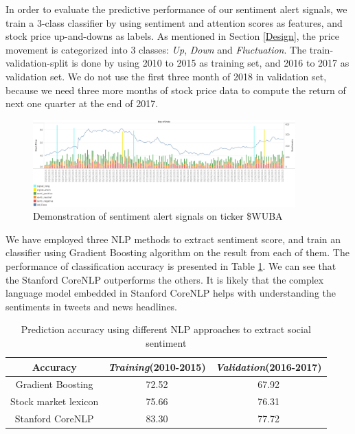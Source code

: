 \documentclass[conference]{IEEEtran}
\begin{document}
In order to evaluate the predictive performance of our sentiment alert signals, we train a 3-class classifier by using sentiment and attention scores as features, and stock price up-and-downs as labels. As mentioned in Section \ref{Design}, the price movement is categorized into 3 classes: \textit{Up}, \textit{Down} and \textit{Fluctuation}. The train-validation-split is done by using 2010 to 2015 as training set, and 2016 to 2017 as validation set. We do not use the first three month of 2018 in validation set, because we need three more months of stock price data to compute the return of next one quarter at the end of 2017. 

\begin{figure}[ht]
\centering
\includegraphics[width=0.9\textwidth]{pics/wubaNew2.png}
\caption{Demonstration of sentiment alert signals on ticker \$WUBA }
\label{wuba}
\end{figure}

We have employed three NLP methods to extract sentiment score, and train an classifier using Gradient Boosting algorithm on the result from each of them. The performance of classification accuracy is presented in Table \ref{accuracytable}. We can see that the Stanford CoreNLP outperforms the others. It is likely that the complex language model embedded in Stanford CoreNLP helps with understanding the sentiments in tweets and news headlines. 

\begin{table}[bp]
\caption{Prediction accuracy using different NLP approaches to extract social sentiment}
\begin{center}
\begin{tabular}{|c|c|c|}
\hline
\textbf{Accuracy} & \textbf{\textit{Training}}(2010-2015)& \textbf{\textit{Validation}}(2016-2017) \\
\hline
Gradient Boosting & 72.52 & 67.92  \\
\hline
Stock market lexicon & 75.66 & 76.31  \\
\hline
Stanford CoreNLP & 83.30 & 77.72  \\
\hline
\end{tabular}
\label{accuracytable}
\end{center}
\end{table}
\end{document}
